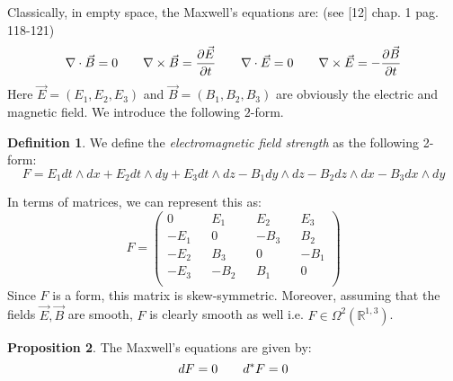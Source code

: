 \documentclass[12pt,a4paper]{report}
\theoremstyle{definition}
\newtheorem{Def}{Definition}[chapter]
\theoremstyle{Theorem}
\newtheorem{Prop}[Def]{Proposition}
\theoremstyle{definition}
\theoremstyle{definition}
\begin{document}
	Classically, in empty space, the Maxwell's equations are: (see [12] chap. 1 pag. 118-121)
	\begin{equation}\label{M.E.}
		\nabla \cdot \vec{B} =0 \hspace{20 pt} \nabla \times \vec{B}={\partial \vec{E}\over \partial t}\hspace{20 pt}\nabla \cdot \vec{E} =0 \hspace{20 pt} \nabla \times \vec{E}=-{\partial \vec{B}\over \partial t}
	\end{equation}
	Here $\vec{E}=(E_1,E_2,E_3)$ and $\vec{B}=(B_1,B_2,B_3)$ are obviously the electric and magnetic field.
	We introduce the following $2$-form.
	\begin{Def}
		We define the \textit{electromagnetic  field strength} as the following 2-form:
		$$F=E_1 dt\wedge dx+E_2 dt\wedge dy+E_3 dt\wedge dz-B_1 dy\wedge dz-B_2 dz\wedge dx-B_3 dx\wedge dy$$
	\end{Def}
	In terms of matrices, we can represent this as:
	$$F=\begin{pmatrix}
		0 && E_1 && E_2 && E_3\\
		-E_1 && 0 && -B_3 && B_2\\
		-E_2 &&  B_3 && 0 && -B_1\\
		-E_3 && -B_2 && B_1 && 0\\ 
	\end{pmatrix}$$
	Since $F$ is a form, this matrix is skew-symmetric. Moreover, assuming that the fields $\vec{E},\vec{B}$ are smooth, $F$ is clearly smooth as well i.e. $F\in\Omega^2(\mathbb{R}^{1,3})$.
	\begin{Prop}
		The Maxwell's equations are given by:
		\begin{equation}\label{Max-Eq}
			dF=0\hspace{20 pt} d^*F=0
		\end{equation}
	\end{Prop}
\end{document}
